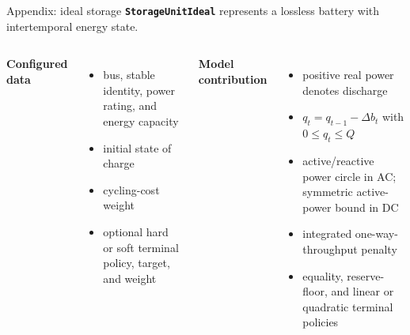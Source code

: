 \documentclass[aspectratio=169,11pt]{beamer}
\newcommand{\tightitems}{\setlength{\itemsep}{0.42em}}
\begin{document}
\begin{frame}{Appendix: ideal storage}
  \textbf{\texttt{StorageUnitIdeal}} represents a lossless battery with intertemporal energy state.
  \begin{columns}[T,onlytextwidth]
    \textbf{Configured data}
    \begin{itemize}\small\tightitems
      \item bus, stable identity, power rating, and energy capacity
      \item initial state of charge
      \item cycling-cost weight
      \item optional hard or soft terminal policy, target, and weight
    \end{itemize}
    \textbf{Model contribution}
    \begin{itemize}\small\tightitems
      \item positive real power denotes discharge
      \item $q_t=q_{t-1}-\Delta b_t$ with $0\leq q_t\leq Q$
      \item active/reactive power circle in AC; symmetric active-power bound in DC
      \item integrated one-way-throughput penalty
      \item equality, reserve-floor, and linear or quadratic terminal policies
    \end{itemize}
  \end{columns}
\end{frame}
\end{document}
